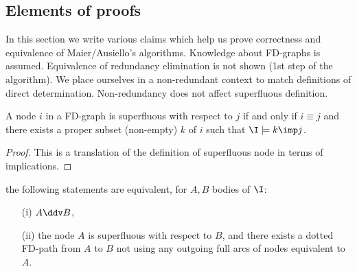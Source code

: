\subsection{Elements of proofs}

In this section we write various claims which help us prove correctness and 
equivalence of Maier/Ausiello's algorithms. Knowledge about FD-graphs is 
assumed. Equivalence of redundancy elimination is not shown (1st step of 
the algorithm). We place ourselves in a non-redundant context to match
definitions of direct determination. Non-redundancy does not affect superfluous
definition.

\begin{claim}
	A node $i$ in a FD-graph is superfluous with respect to $j$ if and only if 
	$i \equiv j$ and there exists a proper subset (non-empty) $k$ of $i$ such 
	that $\I \models k \imp j$. 
\end{claim}

\begin{proof} This is a translation of the definition of superfluous node in 
	terms of implications.	
\end{proof}

\begin{claim} the following statements are equivalent, for $A, B$ bodies of
	$\I$:
	\begin{itemize}
		\item[(i)] $A \ddv B$,
		\item[(ii)] the node $A$ is superfluous with respect to $B$, and there 
		exists 
		a dotted FD-path from $A$ to $B$ not using any outgoing full arcs of
		nodes equivalent to $A$.
	\end{itemize}
	
\end{claim}


